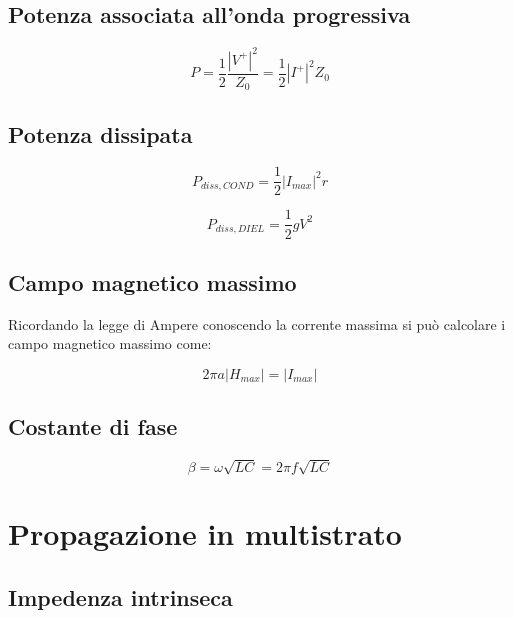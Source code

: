 \documentclass[10pt,a4paper]{report}
\begin{document}
	\section{Potenza associata all'onda progressiva}

			\begin{equation}
			P=\frac{1}{2}\frac{|V^+|^2}{Z_0}=\frac{1}{2}|I^+|^2 Z_0
			\end{equation}

	\section{Potenza dissipata}

			\begin{equation}
			P_{diss,COND}=\frac{1}{2}|I_{max}|^2 r
			\end{equation}

			\begin{equation}
			P_{diss,DIEL}=\frac{1}{2} g V^2
			\end{equation}

	\section{Campo magnetico massimo}
	
 			Ricordando la legge di Ampere conoscendo la corrente massima si può calcolare i campo magnetico massimo come:

			\begin{equation}
			2 \pi a |H_{max}| = |I_{max}|
			\end{equation}

	\section{Costante di fase}
			\begin{equation}
				\beta=\omega \sqrt{LC}=2 \pi f \sqrt{LC}
			\end{equation}
		
\chapter{Propagazione in multistrato}

	\section{Impedenza intrinseca}
\end{document}
